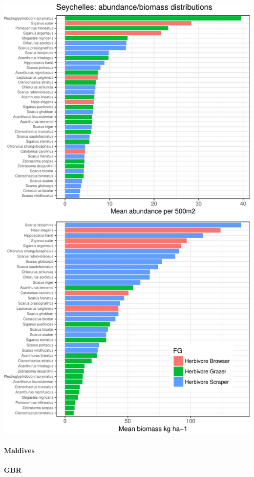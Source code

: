 \documentclass[]{article}
\let\oldparagraph\paragraph
\renewcommand{\paragraph}[1]{\oldparagraph{#1}\mbox{}}
\begin{document}
\includegraphics{UVC-datasets-explore_files/figure-latex/unnamed-chunk-5-1.pdf}

\paragraph{Maldives}\label{maldives}

\paragraph{GBR}\label{gbr}
\end{document}
